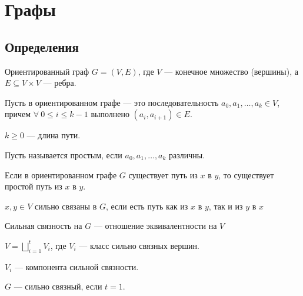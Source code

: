 \section{Графы}

\subsection{Определения}

\begin{defn}{Ориентированный граф}{}
    \( G = ( V, E ) \), где \( V \) --- конечное множество (вершины),
    а \( E \subseteq V \times V \) --- ребра.
\end{defn}

\begin{defn}{}{}
    Пусть в ориентированном графе ---
    это последовательность \( a_0, a_1, \ldots, a_k \in V \),
    причем \( \forall \ 0 \leq i \leq k - 1 \) выполнено \( (a_i, a_{i + 1}) \in E \).

    \( k \geq 0 \) --- длина пути.

    Пусть называется простым, если \( a_0, a_1, \ldots, a_k \) различны.
\end{defn}

\begin{exercise}{}{}
    Если в ориентированном графе \( G \) существует путь из \( x \) в \( y \),
    то существует простой путь из \( x \) в \( y \).
\end{exercise}

\begin{defn}{}{}
    \( x, y \in V \) сильно связаны в \( G \), если есть путь как из \( x \) в \( y \), так и из \( y \) в \( x \)
\end{defn}

\begin{lemma}{}{}
    Сильная связность на \( G \) --- отношение эквивалентности на \( V \)
\end{lemma}

\begin{coroll}{}{}
    \( V = \bigsqcup\limits_{i = 1}^t V_i \),
    где \( V_i \) --- класс сильно связных вершин.
\end{coroll}

\begin{defn}{}{}
    \( V_i \) --- компонента сильной связности.
\end{defn}

\begin{defn}{}{}
    \( G \) --- сильно связный, если \( t = 1 \).
\end{defn}

